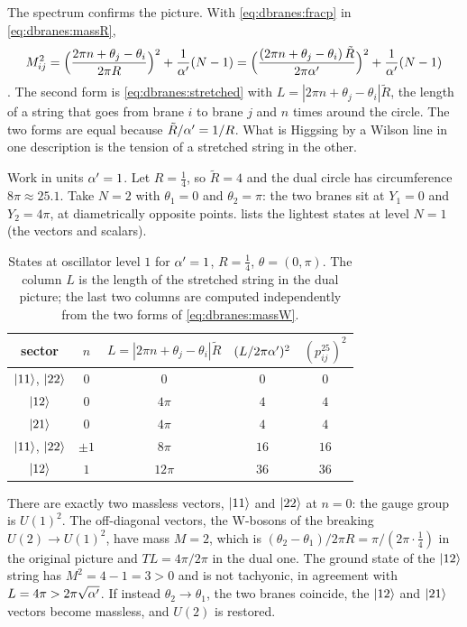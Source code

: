 The spectrum confirms the picture. With \eqref{eq:dbranes:fracp} in \eqref{eq:dbranes:massR},
\begin{equation}\label{eq:dbranes:massW}
 M^2_{ij}=\Big(\frac{2\pi n+\theta_j-\theta_i}{2\pi R}\Big)^2+\frac1{\alpha'}(N-1)
 =\Big(\frac{(2\pi n+\theta_j-\theta_i)\,\tilde R}{2\pi\alpha'}\Big)^2+\frac1{\alpha'}(N-1)
\end{equation}
. The second form is \eqref{eq:dbranes:stretched} with
$L=|2\pi n+\theta_j-\theta_i|\tilde R$, the length of a string that goes from brane $i$ to brane $j$
and $n$ times around the circle. The two forms are equal because $\tilde R/\alpha'=1/R$. What is
Higgsing by a Wilson line in one description is the tension of a stretched string in the other.

\begin{example}\label{ex:dbranes:numbers}
Work in units $\alpha'=1$. Let $R=\frac14$, so $\tilde R=4$ and the dual circle has circumference
$8\pi\approx25.1$. Take $N=2$ with $\theta_1=0$ and $\theta_2=\pi$: the two branes sit at
$Y_1=0$ and $Y_2=4\pi$, at diametrically opposite points.  lists the
lightest states at level $N=1$ (the vectors and scalars).
\begin{table}[ht]
\centering
\caption{States at oscillator level $1$ for $\alpha'=1$, $R=\frac14$, $\theta=(0,\pi)$. The column
$L$ is the length of the stretched string in the dual picture; the last two columns are
computed independently from the two forms of \eqref{eq:dbranes:massW}.}
\label{tab:dbranes:example}
\begin{tabular}{@{}ccccc@{}}\toprule
sector & $n$ & $L=|2\pi n+\theta_j-\theta_i|\tilde R$ & $(L/2\pi\alpha')^2$ & $(p^{25}_{ij})^2$\\\midrule
$|11\rangle$, $|22\rangle$ & $0$ & $0$ & $0$ & $0$\\
$|12\rangle$ & $0$ & $4\pi$ & $4$ & $4$\\
$|21\rangle$ & $0$ & $4\pi$ & $4$ & $4$\\
$|11\rangle$, $|22\rangle$ & $\pm1$ & $8\pi$ & $16$ & $16$\\
$|12\rangle$ & $1$ & $12\pi$ & $36$ & $36$\\\bottomrule
\end{tabular}
\end{table}
There are exactly two massless vectors, $|11\rangle$ and $|22\rangle$ at $n=0$: the gauge group is
$U(1)^2$. The off-diagonal vectors, the W-bosons of the breaking $U(2)\to U(1)^2$, have mass
$M=2$, which is $(\theta_2-\theta_1)/2\pi R=\pi/(2\pi\cdot\frac14)$ in the original picture and
$TL=4\pi/2\pi$ in the dual one. The ground state of the $|12\rangle$ string has $M^2=4-1=3>0$ and is
not tachyonic, in agreement with $L=4\pi>2\pi\sqrt{\alpha'}$. If instead $\theta_2\to\theta_1$, the two
branes coincide, the $|12\rangle$ and $|21\rangle$ vectors become massless, and $U(2)$ is restored.
\end{example}

